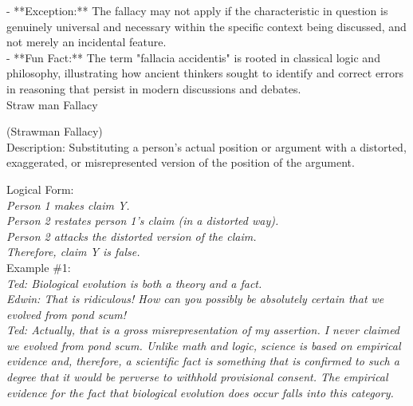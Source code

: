 \documentclass[a4paper,12pt,single,pdftex]{scrbook}
\begin{document}
    
      - **Exception:** The fallacy may not apply if the characteristic in question is genuinely universal and necessary within the specific context being discussed, and not merely an incidental feature.
    \\

    
      - **Fun Fact:** The term "fallacia accidentis" is rooted in classical logic and philosophy, illustrating how ancient thinkers sought to identify and correct errors in reasoning that persist in modern discussions and debates.
    \\

  

Straw man Fallacy
    
      (Strawman Fallacy)
    \\

  
    Description: Substituting a person’s actual position or argument with a distorted, exaggerated, or misrepresented version of the position of the argument.

    
      Logical Form:
    \\

    
      {\em Person 1 makes claim Y.}
    \\

    
      {\em Person 2 restates person 1’s claim (in a distorted way).}
    \\

    
      {\em Person 2 attacks the distorted version of the claim.}
    \\

    
      {\em Therefore, claim Y is false.}
    \\

    
      Example \#1:
    \\

    
      {\em Ted: Biological evolution is both a theory and a fact.}
    \\

    
      {\em Edwin: That is ridiculous!  How can you possibly be absolutely certain that we evolved from pond scum!}
    \\

    
      {\em Ted: Actually, that is a gross misrepresentation of my assertion.  I never claimed we evolved from pond scum.  Unlike math and logic, science is based on empirical evidence and, therefore, a scientific fact is something that is confirmed to such a degree that it would be perverse to withhold provisional consent.  The empirical evidence for the fact that biological evolution does occur falls into this category.}
    \\
\end{document}

